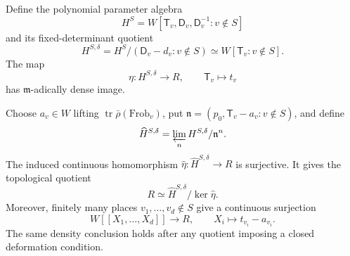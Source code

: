 \begin{theorem}
\label{v4-arith:ic:w10-e:thm:bc-bernstein-galois}
Define the polynomial parameter algebra
\[
 H^S=W[\mathsf T_v,\mathsf D_v,\mathsf D_v^{-1}:v\notin S]
\]
and its fixed-determinant quotient
\[
 H^{S,\delta}=H^S/(\mathsf D_v-d_v:v\notin S)
 \simeq W[\mathsf T_v:v\notin S].
\]
The map
\[
 \eta:H^{S,\delta}\longrightarrow R,\qquad
 \mathsf T_v\longmapsto t_v
\]
has $\mathfrak m$-adically dense image.

Choose $a_v\in W$ lifting $\operatorname{tr}\bar\rho(\mathrm{Frob}_v)$,
put $\mathfrak n=(p_0,\mathsf T_v-a_v:v\notin S)$, and define
\[
 \widehat H^{S,\delta}
 =\varprojlim_n H^{S,\delta}/\mathfrak n^n.
\]
The induced continuous homomorphism
$\widehat\eta:\widehat H^{S,\delta}\to R$ is surjective.
It gives the topological quotient
\begin{equation}
\label{v4-arith:ic:w10-e:eq:bc-global}
 R\simeq\widehat H^{S,\delta}/\ker\widehat\eta.
\end{equation}
Moreover, finitely many places $v_1,\ldots,v_d\notin S$ give a
continuous surjection
\[
 W[[X_1,\ldots,X_d]]\longrightarrow R,\qquad
 X_i\longmapsto t_{v_i}-a_{v_i}.
\]
The same density conclusion holds after any quotient imposing a
closed deformation condition.
\end{theorem}

